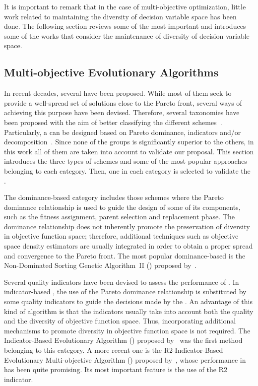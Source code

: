 It is important to remark that in the case of multi-objective optimization, little work related to maintaining the 
diversity of decision variable space has been done.
%
The following section reviews some of the most important \MOEAS{} and introduces some of the works that consider
the maintenance of diversity of decision variable space.

\subsection{Multi-objective Evolutionary Algorithms}

In recent decades, several \MOEAS{} have been proposed. 
%
While most of them seek to provide a well-spread set of solutions close to the Pareto front,
several ways of achieving this purpose have been devised.
%
Therefore, several taxonomies have been proposed with the aim of better classifying the different 
schemes~\citep{Joel:BOOK_MOEAs}.
%
Particularly, a \MOEA{} can be designed based on Pareto dominance, indicators and/or decomposition~\citep{trivedi2016survey}.
%
Since none of the groups is significantly superior to the others, in this work all of them are taken into account to validate
our proposal.
%
This section introduces the three types of schemes and some of the most popular approaches belonging to each category.
%
Then, one \MOEA{} in each category is selected to validate the \VSDMOEA{}.

The dominance-based category includes those schemes where the Pareto dominance relationship is used to guide the 
design of some of its components, such as the fitness assignment, parent selection and replacement phase.
%
The dominance relationship does not inherently promote the preservation of diversity in objective function space; 
therefore, additional techniques such as objective space density estimators are usually integrated in order to obtain 
a proper spread and convergence to the Pareto front.
%
The most popular dominance-based \MOEA{} is the Non-Dominated Sorting Genetic Algorithm~II (\NSGAII{}) proposed by~\cite{Joel:NSGAII}.
%

Several quality indicators have been devised to assess the performance of \MOEAS{}.
%
In indicator-based \MOEAS{}, the use of the Pareto dominance relationship is substituted by some quality indicators 
to guide the decisions made by the \MOEA{}.
%
An advantage of this kind of algorithm is that the indicators usually take into account both the quality and 
the diversity of objective function space. Thus, incorporating additional mechanisms to promote diversity in 
objective function space is not required.
%
The Indicator-Based Evolutionary Algorithm (\IBEA{}) proposed by~\cite{zitzler2004indicator} 
was the first method belonging to this category.
%
A more recent one is the R2-Indicator-Based Evolutionary Multi-objective Algorithm (\RMOEA{}) proposed by~\cite{trautmann2013r2}, 
whose performance in \MOPS{} has been quite promising.
%
Its most important feature is the use of the R2 indicator.

